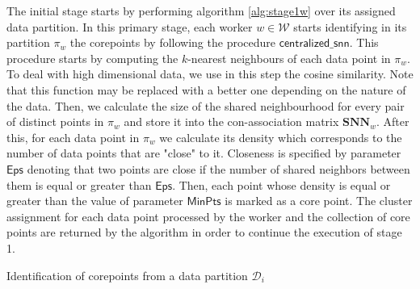 \documentclass[preprint,12pt,authoryear,review]{elsarticle}
\begin{document}
The initial stage starts by performing algorithm \ref{alg:stage1w} over its assigned data partition.
In this primary stage, each worker $w\in\mathcal{W}$ starts identifying in its partition $\pi_w$ the corepoints by following the procedure $\mathsf{centralized\_snn}$.%
This procedure starts by computing the $k$-nearest neighbours of each data point in $\pi_w$. To deal with high dimensional data, we use in this step the cosine similarity. Note that this function may be replaced with a better one depending on the nature of the data. Then, we calculate the size of the shared neighbourhood for every pair of distinct points in $\pi_w$ and store it into the con-association matrix $\mathbf{SNN}_w$. After this, for each data point in $\pi_w$ we calculate its density which corresponds to the number of data points that are "close" to it. Closeness is specified by parameter $\mathsf{Eps}$ denoting that two points are close if the number of shared neighbors between them is equal or greater than $\mathsf{Eps}$. Then, each point whose density is equal or greater than the value of parameter $\mathsf{MinPts}$ is marked as a core point. The cluster assignment for each data point processed by the worker and the collection of core points are returned by the algorithm in order to continue the execution of stage 1.

\iffalse %
\begin{algorithm}[!htbp]
   \DontPrintSemicolon
  
\caption{Identification of corepoints from a data partition $\mathcal{D}_i$}
\label{alg:snncorepointid}
\end{algorithm}
\end{document}

